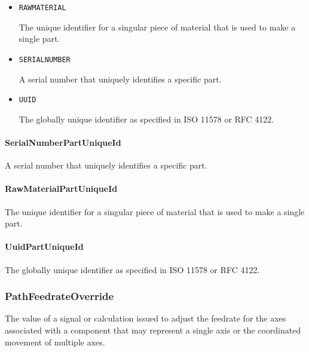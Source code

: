 \begin{itemize}

\item \texttt{RAW\textunderscore MATERIAL}


The unique identifier for a singular piece of material that is used to make a single part.

\item \texttt{SERIAL\textunderscore NUMBER}


A serial number that uniquely identifies a specific part.

\item \texttt{UUID}


The globally unique identifier as specified in ISO 11578 or RFC 4122.


\end{itemize}

\paragraph{SerialNumberPartUniqueId}\mbox{}
\label{sec:SerialNumberPartUniqueId}


A serial number that uniquely identifies a specific part.


\paragraph{RawMaterialPartUniqueId}\mbox{}
\label{sec:RawMaterialPartUniqueId}


The unique identifier for a singular piece of material that is used to make a single part.


\paragraph{UuidPartUniqueId}\mbox{}
\label{sec:UuidPartUniqueId}


The globally unique identifier as specified in ISO 11578 or RFC 4122.


\subsubsection{PathFeedrateOverride}
\label{sec:PathFeedrateOverride}



The value of a signal or calculation issued to adjust the feedrate for the axes associated with a  component that may represent a single axis or the coordinated movement of multiple axes.


